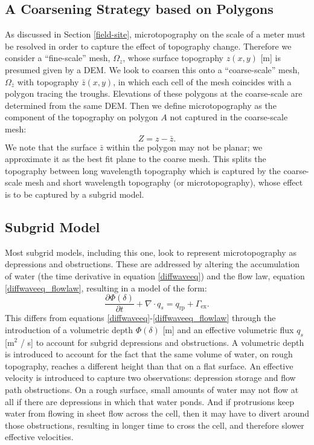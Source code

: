\subsection{A Coarsening Strategy based on Polygons}
As discussed in Section \ref{field-site}, microtopography on the scale of a meter must be resolved in order to capture the effect of topography change.
Therefore we consider a ``fine-scale'' mesh, $\Omega_z$, whose surface topography $z(x,y)$ [m] is presumed given by a DEM.
We look to coarsen this onto a ``coarse-scale'' mesh, $\Omega_{\bar{z}}$ with topography $\bar{z}(x,y)$, in which each cell of the mesh coincides with a polygon tracing the troughs.
Elevations of these polygons at the coarse-scale are determined from the same DEM.
Then we define microtopography as the component of the topography on polygon $A$ not captured in the coarse-scale mesh:
%
\begin{equation}\label{local_topography}
  Z = z - \bar{z}.
\end{equation}
%
We note that the surface $\bar{z}$ within the polygon may not be planar; we approximate it as the best fit plane to the coarse mesh.
This splits the topography between long wavelength topography which is captured by the coarse-scale mesh and short wavelength topography (or microtopography), whose effect is to be captured by a subgrid model.

%
\subsection{Subgrid Model}\label{subgridmodel}
Most subgrid models, including this one, look to represent microtopography as depressions and obstructions.
These are addressed by altering the accumulation of water (the time derivative in equation \ref{diffwaveeq}) and the flow law, equation \ref{diffwaveeq_flowlaw}, resulting in a model of the form:
%
\begin{equation}\label{subgrid}
\frac{\partial \Phi (\delta)}{\partial t} + \nabla \cdot q_s = q_\text{rp} + \Gamma_\text{ex}.
\end{equation}
%
This differs from equations \ref{diffwaveeq}-\ref{diffwaveeq_flowlaw} through the introduction of a volumetric depth $\Phi(\delta)$ [m] and an effective volumetric flux $q_s$ [m$^2$ / s] to account for subgrid depressions and obstructions.
A volumetric depth is introduced to account for the fact that the same volume of water, on rough topography, reaches a different height than that on a flat surface.
An effective velocity is introduced to capture two observations: depression storage and flow path obstructions.
On a rough surface, small amounts of water may not flow at all if there are depressions in which that water ponds.
And if protrusions keep water from flowing in sheet flow across the cell, then it may have to divert around those obstructions, resulting in longer time to cross the cell, and therefore slower effective velocities.

